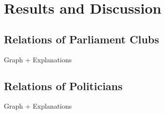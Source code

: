\chapter{Results and Discussion}
\label{chap:evaluation}

\section{Relations of Parliament Clubs}
Graph + Explanations

\section{Relations of Politicians}
Graph + Explanations